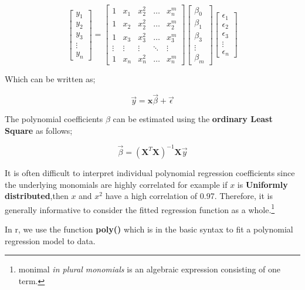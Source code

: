 \documentclass[
]{article}
\begin{document}
\[\begin{bmatrix}y_1\\y_2\\y_3\\\vdots\\y_n \end{bmatrix}=\begin{bmatrix}1&x_1&x_2^2&\dots&x_n^m\\1&x_2&x_2^2&\dots&x_2^m\\1&x_3&x_3^2&\dots&x_3^m\\\vdots&\vdots&\vdots&\ddots&\vdots\\1&x_n&x_n^2&\dots&x_n^m\end{bmatrix}\begin{bmatrix}\beta_0\\\beta_1\\\beta_3\\\vdots\\\beta_m\end{bmatrix}\begin{bmatrix}\epsilon_1\\\epsilon_2\\\epsilon_3\\\vdots\\\epsilon_n\end{bmatrix}\]

Which can be written as;

\[\vec{y}=\mathbf{x}\vec{\beta}+\vec{\epsilon}\]

The polynomial coefficients \(\beta\) can be estimated using the
\textbf{ordinary Least Square} as follows;

\[\vec{\beta}=(\mathbf{X}^T\mathbf{X})^{-1}\mathbf{X}\vec{y}\]

It is often difficult to interpret individual polynomial regression
coefficients since the underlying monomials are highly correlated for
example if \(x\) is \textbf{Uniformly distributed},then \(x\) and
\(x^2\) have a high correlation of 0.97. Therefore, it is generally
informative to consider the fitted regression function as a
whole.\footnote{monimal \emph{in plural monomials} is an algebraic
  expression consisting of one term.}

In r, we use the function \textbf{poly()} which is in the basic syntax
to fit a polynomial regression model to data.
\end{document}
